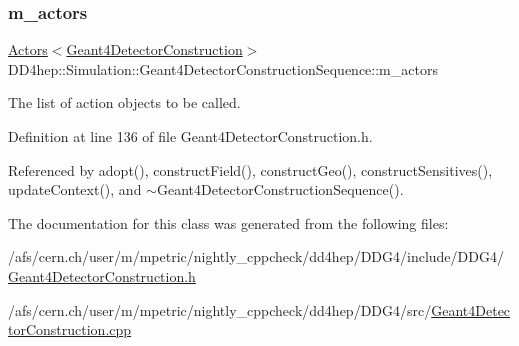 \subsubsection{\texorpdfstring{m\+\_\+actors}{m\_actors}}
{\footnotesize\ttfamily \hyperlink{class_d_d4hep_1_1_simulation_1_1_geant4_action_1_1_actors}{Actors}$<$\hyperlink{class_d_d4hep_1_1_simulation_1_1_geant4_detector_construction}{Geant4\+Detector\+Construction}$>$ D\+D4hep\+::\+Simulation\+::\+Geant4\+Detector\+Construction\+Sequence\+::m\+\_\+actors\hspace{0.3cm}{\ttfamily [protected]}}



The list of action objects to be called. 



Definition at line 136 of file Geant4\+Detector\+Construction.\+h.



Referenced by adopt(), construct\+Field(), construct\+Geo(), construct\+Sensitives(), update\+Context(), and $\sim$\+Geant4\+Detector\+Construction\+Sequence().



The documentation for this class was generated from the following files\+:\begin{DoxyCompactItemize}
\item 
/afs/cern.\+ch/user/m/mpetric/nightly\+\_\+cppcheck/dd4hep/\+D\+D\+G4/include/\+D\+D\+G4/\hyperlink{_geant4_detector_construction_8h}{Geant4\+Detector\+Construction.\+h}\item 
/afs/cern.\+ch/user/m/mpetric/nightly\+\_\+cppcheck/dd4hep/\+D\+D\+G4/src/\hyperlink{_geant4_detector_construction_8cpp}{Geant4\+Detector\+Construction.\+cpp}\end{DoxyCompactItemize}

